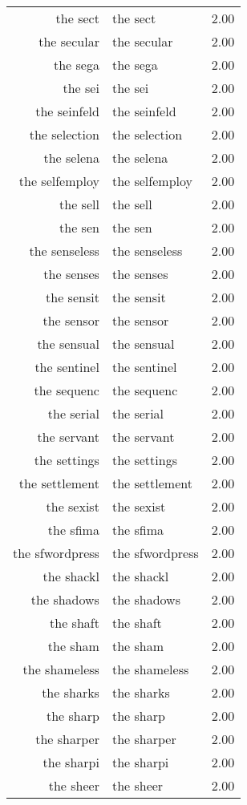 \begin{table}[ht]
\begin{tabular}{rlr}
  the sect & the sect & 2.00 \\ 
  the secular & the secular & 2.00 \\ 
  the sega & the sega & 2.00 \\ 
  the sei & the sei & 2.00 \\ 
  the seinfeld & the seinfeld & 2.00 \\ 
  the selection & the selection & 2.00 \\ 
  the selena & the selena & 2.00 \\ 
  the selfemploy & the selfemploy & 2.00 \\ 
  the sell & the sell & 2.00 \\ 
  the sen & the sen & 2.00 \\ 
  the senseless & the senseless & 2.00 \\ 
  the senses & the senses & 2.00 \\ 
  the sensit & the sensit & 2.00 \\ 
  the sensor & the sensor & 2.00 \\ 
  the sensual & the sensual & 2.00 \\ 
  the sentinel & the sentinel & 2.00 \\ 
  the sequenc & the sequenc & 2.00 \\ 
  the serial & the serial & 2.00 \\ 
  the servant & the servant & 2.00 \\ 
  the settings & the settings & 2.00 \\ 
  the settlement & the settlement & 2.00 \\ 
  the sexist & the sexist & 2.00 \\ 
  the sfima & the sfima & 2.00 \\ 
  the sfwordpress & the sfwordpress & 2.00 \\ 
  the shackl & the shackl & 2.00 \\ 
  the shadows & the shadows & 2.00 \\ 
  the shaft & the shaft & 2.00 \\ 
  the sham & the sham & 2.00 \\ 
  the shameless & the shameless & 2.00 \\ 
  the sharks & the sharks & 2.00 \\ 
  the sharp & the sharp & 2.00 \\ 
  the sharper & the sharper & 2.00 \\ 
  the sharpi & the sharpi & 2.00 \\ 
  the sheer & the sheer & 2.00 \\ 

\end{tabular}
\end{table}
